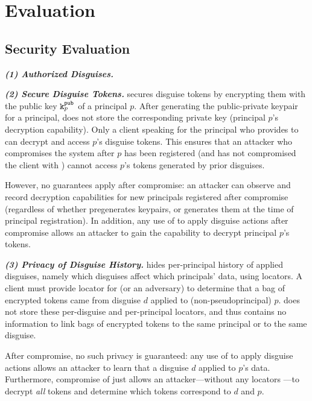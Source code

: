 \section{Evaluation}
\subsection{Security Evaluation}
%
\vspace{6pt}\noindent\textbf{\emph{(1) Authorized Disguises.}}
%

\vspace{6pt}\noindent\textbf{\emph{(2) Secure Disguise Tokens.}}
%
\sys secures disguise tokens by encrypting them with the public key $\texttt{\ensuremath{\texttt{k}^{\text{pub}}_{p}}}$ of a principal $p$.
After generating the public-private keypair for a principal, \sys does not store the corresponding
private key  (principal $p$'s decryption capability). Only a client speaking for the
principal who provides  to \sys can decrypt and access $p$'s disguise tokens.
This ensures that an attacker who compromises the system after $p$ has been registered (and has not
compromised the client with ) cannot access $p$'s tokens generated by prior disguises.

However, no guarantees apply after compromise: an attacker can observe and record decryption
capabilities for new principals registered after compromise (regardless of whether \sys pregenerates
keypairs, or generates them at the time of principal registration). In addition, any use of
 to apply disguise actions after compromise allows an attacker to gain the capability to
decrypt principal $p$'s tokens.
%

\vspace{6pt}\noindent\textbf{\emph{(3) Privacy of Disguise History.}}
%
\sys hides per-principal history of applied disguises, namely which disguises affect which
principals' data, using locators. A client must provide locator  for \sys (or an
adversary) to determine that a bag of encrypted tokens came from disguise $d$ applied to
(non-pseudoprincipal) $p$. \sys does not store these per-disguise and per-principal locators, and
thus contains no information to link bags of encrypted tokens to the same principal or to the
same disguise.

After compromise, no such privacy is guaranteed: any use of  to apply disguise actions
allows an attacker to learn that a disguise $d$ applied to $p$'s data. Furthermore, 
compromise of just  allows an attacker---without any locators ---to decrypt \emph{all} tokens and
determine which tokens correspond to $d$ and $p$.

